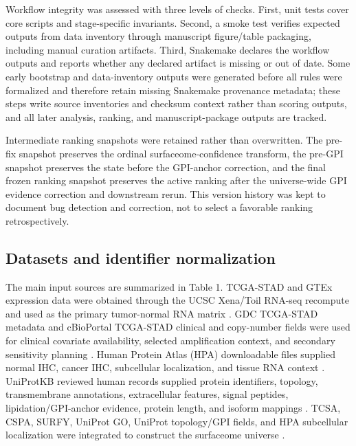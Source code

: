 \documentclass[preprint,12pt,authoryear]{elsarticle}
\begin{document}
Workflow integrity was assessed with three levels of checks. First, unit tests cover core scripts and stage-specific invariants. Second, a smoke test verifies expected outputs from data inventory through manuscript figure/\allowbreak{}table packaging, including manual curation artifacts. Third, Snakemake declares the workflow outputs and reports whether any declared artifact is missing or out of date. Some early bootstrap and data-inventory outputs were generated before all rules were formalized and therefore retain missing Snakemake provenance metadata;\allowbreak{} these steps write source inventories and checksum context rather than scoring outputs, and all later analysis, ranking, and manuscript-package outputs are tracked.

Intermediate ranking snapshots were retained rather than overwritten. The pre-fix snapshot preserves the ordinal surfaceome-confidence transform, the pre-GPI snapshot preserves the state before the GPI-anchor correction, and the final frozen ranking snapshot preserves the active ranking after the universe-wide GPI evidence correction and downstream rerun. This version history was kept to document bug detection and correction, not to select a favorable ranking retrospectively.

\subsection{Datasets and identifier normalization}

The main input sources are summarized in Table 1. TCGA-STAD and GTEx expression data were obtained through the UCSC Xena/\allowbreak{}Toil RNA-seq recompute and used as the primary tumor-normal RNA matrix \citep{goldman2020xena,vivian2017toil,gtex2020atlas}. GDC TCGA-STAD metadata and cBioPortal TCGA-STAD clinical and copy-number fields were used for clinical covariate availability, selected amplification context, and secondary sensitivity planning \citep{grossman2016gdc,cerami2012cbioportal}. Human Protein Atlas (HPA) downloadable files supplied normal IHC, cancer IHC, subcellular localization, and tissue RNA context \citep{uhlen2015hpa,uhlen2017pathology,thul2017subcellular}. UniProtKB reviewed human records supplied protein identifiers, topology, transmembrane annotations, extracellular features, signal peptides, lipidation/\allowbreak{}GPI-anchor evidence, protein length, and isoform mappings \citep{uniprot2025}. TCSA, CSPA, SURFY, UniProt GO, UniProt topology/\allowbreak{}GPI fields, and HPA subcellular localization were integrated to construct the surfaceome universe \citep{hu2021surfaceome,bauschfluck2015cspa,bauschfluck2018surfy}.
\end{document}
